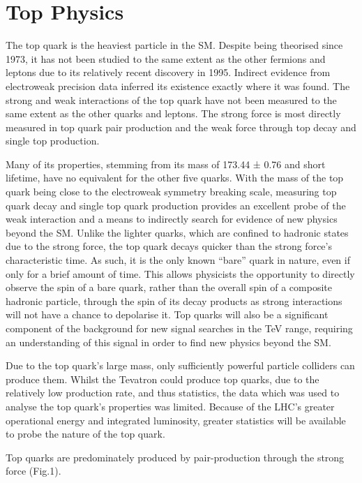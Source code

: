 \section{Top Physics}\label{sec:top-physics}

The top quark is the heaviest particle in the SM. Despite being theorised since 1973, it has not been studied to the same extent as the other fermions and leptons due to its relatively recent discovery in 1995. 
Indirect evidence from electroweak precision data inferred its existence exactly where it was found. 
The strong and weak interactions of the top quark have not been measured to the same extent as the other quarks and leptons.
The strong force is most directly measured in top quark pair production and the weak force through top decay and single top production. 

Many of its properties, stemming from its mass  of 173.44 ± 0.76 \GeV and short lifetime, have no equivalent for the other five quarks. 
With the mass of the top quark being close to the electroweak symmetry breaking scale, measuring top quark decay and single top quark production provides an excellent probe of the weak interaction and a means to indirectly search for evidence of new physics beyond the SM. 
Unlike the lighter quarks, which are confined to hadronic states due to the strong force, the top quark decays quicker than the strong force’s characteristic time.
As such, it is the only known ``bare'' quark in nature, even if only for a brief amount of time. 
This allows physicists the opportunity to directly observe the spin of a bare quark, rather than the overall spin of a composite hadronic particle, through the spin of its decay products as strong interactions will not have a chance to depolarise it.
Top quarks will also be a significant component of the background for new signal searches in the TeV range, requiring an understanding of this signal in order to find new physics beyond the SM.

Due to the top quark’s large mass, only sufficiently powerful particle colliders can produce them. 
Whilst the Tevatron could produce top quarks, due to the relatively low production rate, and thus statistics, the data which was used to analyse the top quark’s properties was limited.
Because of the LHC’s greater operational energy and integrated luminosity, greater statistics will be available to probe the nature of the top quark. 

Top quarks are predominately produced by pair-production through the strong force (Fig.1).

